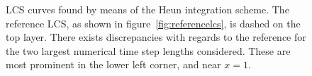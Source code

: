 \begin{figure}[htpb]
    \centering
    
    \caption[LCS curves found by means of the Heun integration scheme]{
        LCS curves found by means of the Heun integration scheme. The
        reference LCS, as shown in figure~\ref{fig:referencelcs},
        is dashed on the top layer. There exists discrepancies with
        regards to the reference for the two largest numerical time step
        lengths considered. These are most prominent in the lower left corner,
        and near $x=1$.}
    \label{fig:lcs_rk2}
\end{figure}
